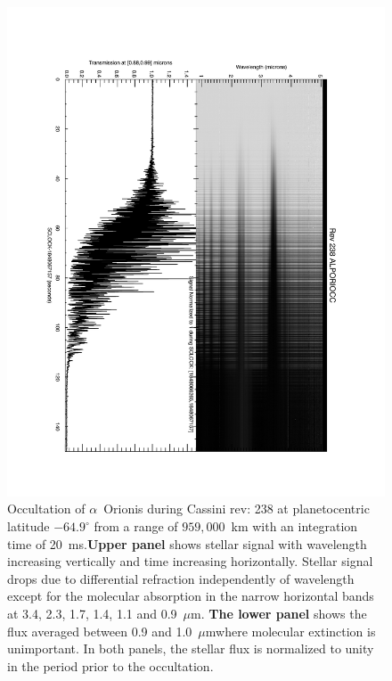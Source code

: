 \documentclass[preprint]{aastex}
\newcommand{\microns}{$\mu$m}     %
\begin{document}
\begin{multicols}{2}
\begin{figure}[ht]
\centering
\includegraphics[angle=90, width=\textwidth]{./figs/alporiocc238_atmov_072517.pdf}

\caption{
\footnotesize
Occultation of $\alpha$~Orionis during Cassini rev: 238 at planetocentric
latitude $-64.9^\circ$ from a range of $959,000$~km with an integration time of
20~ms.{\bf Upper panel} shows stellar signal with wavelength increasing
vertically and time increasing horizontally. Stellar signal drops due to
differential refraction independently of wavelength except for the molecular
absorption in the narrow horizontal bands at 3.4, 2.3, 1.7, 1.4, 1.1 and
0.9~\microns.  {\bf The lower panel} shows the flux averaged between 0.9 and
1.0~\microns where molecular extinction is unimportant. In both panels, the
stellar flux is normalized to unity in the period prior to the occultation. 
}

\label{fig:datasample}
\end{figure}


\end{multicols}
\end{document}

